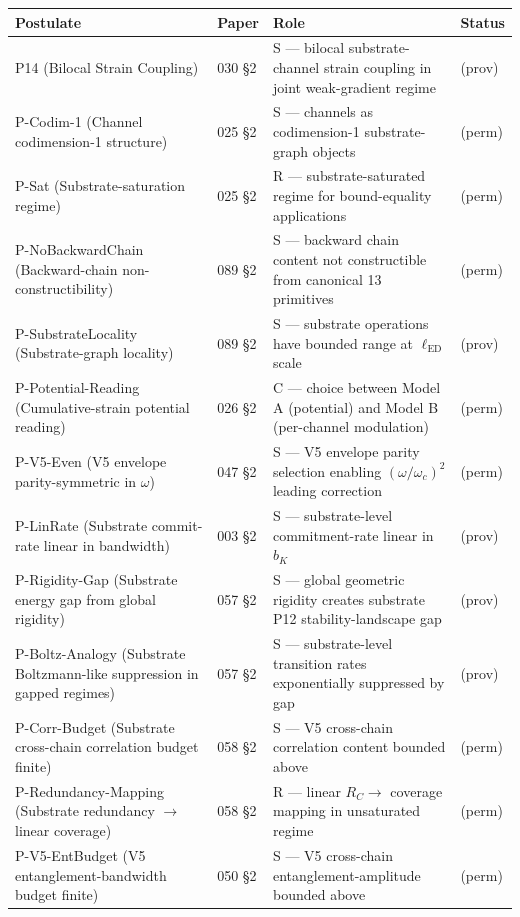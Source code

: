\documentclass[11pt,a4paper]{article}
\begin{document}
{\footnotesize
\begin{longtable}{p{}p{}p{}p{}}
\toprule
\textbf{Postulate} & \textbf{Paper} & \textbf{Role} & \textbf{Status} \\
\midrule
\endhead
P14 (Bilocal Strain Coupling) & 030 \S2 & S --- bilocal substrate-channel strain coupling in joint weak-gradient regime & (prov) \\
P-Codim-1 (Channel codimension-1 structure) & 025 \S2 & S --- channels as codimension-1 substrate-graph objects & (perm) \\
P-Sat (Substrate-saturation regime) & 025 \S2 & R --- substrate-saturated regime for bound-equality applications & (perm) \\
P-NoBackwardChain (Backward-chain non-constructibility) & 089 \S2 & S --- backward chain content not constructible from canonical 13 primitives & (perm) \\
P-SubstrateLocality (Substrate-graph locality) & 089 \S2 & S --- substrate operations have bounded range at $\ell_\mathrm{ED}$ scale & (prov) \\
P-Potential-Reading (Cumulative-strain potential reading) & 026 \S2 & C --- choice between Model A (potential) and Model B (per-channel modulation) & (perm) \\
P-V5-Even (V5 envelope parity-symmetric in $\omega$) & 047 \S2 & S --- V5 envelope parity selection enabling $(\omega/\omega_c)^2$ leading correction & (perm) \\
P-LinRate (Substrate commit-rate linear in bandwidth) & 003 \S2 & S --- substrate-level commitment-rate linear in $b_K$ & (prov) \\
P-Rigidity-Gap (Substrate energy gap from global rigidity) & 057 \S2 & S --- global geometric rigidity creates substrate P12 stability-landscape gap & (prov) \\
P-Boltz-Analogy (Substrate Boltzmann-like suppression in gapped regimes) & 057 \S2 & S --- substrate-level transition rates exponentially suppressed by gap & (prov) \\
P-Corr-Budget (Substrate cross-chain correlation budget finite) & 058 \S2 & S --- V5 cross-chain correlation content bounded above & (perm) \\
P-Redundancy-Mapping (Substrate redundancy $\to$ linear coverage) & 058 \S2 & R --- linear $R_C \to$ coverage mapping in unsaturated regime & (perm) \\
P-V5-EntBudget (V5 entanglement-bandwidth budget finite) & 050 \S2 & S --- V5 cross-chain entanglement-amplitude bounded above & (perm) \\

\end{longtable}}
\end{document}
